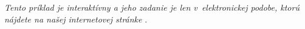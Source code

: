 \createTaskHeader[Interaktívny]
\emph{Tento príklad je interaktívny a jeho zadanie je len v~elektronickej podobe, ktorú nájdete na
našej internetovej stránke} \href{\seminarURL}{\texttt{\seminarURL}}.
